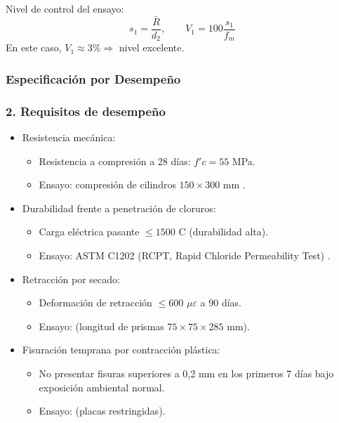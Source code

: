 \noindent Nivel de control del ensayo:
\begin{equation}
    s_1 = \frac{\bar{R}}{d_2}, \qquad V_1 = 100 \frac{s_1}{f_m}
\end{equation}
En este caso, $V_1 \approx 3\% \Rightarrow$ nivel excelente.

\subsubsection{Especificación por Desempeño}

\subsubsection*{2. Requisitos de desempeño}

\begin{itemize}
    \item Resistencia mecánica:
    \begin{itemize}
        \item Resistencia a compresión a 28 días: $f'c = 55$ MPa.
        \item Ensayo: compresión de cilindros $150 \times 300$ mm \citep{NCh1037_Of2009}.
    \end{itemize}

    \item Durabilidad frente a penetración de cloruros:
    \begin{itemize}
        \item Carga eléctrica pasante $\leq 1500$ C (durabilidad alta).
        \item Ensayo: ASTM C1202 (RCPT, Rapid Chloride Permeability Test) \citep{ASTM_C1202_2012}.
    \end{itemize}

    \item Retracción por secado:
    \begin{itemize}
        \item Deformación de retracción $\leq 600$ $\mu\varepsilon$ a 90 días.
        \item Ensayo: \citep{ASTM_C157_2014} (longitud de prismas $75 \times 75 \times 285$ mm).
    \end{itemize}

    \item Fisuración temprana por contracción plástica:
    \begin{itemize}
        \item No presentar fisuras superiores a 0,2 mm en los primeros 7 días bajo exposición ambiental normal.
        \item Ensayo: \citep{ASTM_C1579_2013} (placas restringidas).
    \end{itemize}


\end{itemize}
